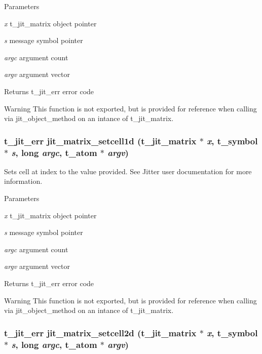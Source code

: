 \begin{DoxyParams}{Parameters}
\item[{\em x}]t\_\-jit\_\-matrix object pointer \item[{\em s}]message symbol pointer \item[{\em argc}]argument count \item[{\em argv}]argument vector\end{DoxyParams}
\begin{DoxyReturn}{Returns}
t\_\-jit\_\-err error code
\end{DoxyReturn}
\begin{DoxyWarning}{Warning}
This function is not exported, but is provided for reference when calling via jit\_\-object\_\-method on an intance of t\_\-jit\_\-matrix. 
\end{DoxyWarning}
\hypertarget{group__matrixmod_gacebbcc6a1a5a2211930b83e5742122e4}{
\subsubsection[{jit\_\-matrix\_\-setcell1d}]{\setlength{\rightskip}{0pt plus 5cm}t\_\-jit\_\-err jit\_\-matrix\_\-setcell1d (t\_\-jit\_\-matrix $\ast$ {\em x}, \/  {\bf t\_\-symbol} $\ast$ {\em s}, \/  long {\em argc}, \/  {\bf t\_\-atom} $\ast$ {\em argv})}}
\label{group__matrixmod_gacebbcc6a1a5a2211930b83e5742122e4}


Sets cell at index to the value provided. See Jitter user documentation for more information.


\begin{DoxyParams}{Parameters}
\item[{\em x}]t\_\-jit\_\-matrix object pointer \item[{\em s}]message symbol pointer \item[{\em argc}]argument count \item[{\em argv}]argument vector\end{DoxyParams}
\begin{DoxyReturn}{Returns}
t\_\-jit\_\-err error code
\end{DoxyReturn}
\begin{DoxyWarning}{Warning}
This function is not exported, but is provided for reference when calling via jit\_\-object\_\-method on an intance of t\_\-jit\_\-matrix. 
\end{DoxyWarning}
\hypertarget{group__matrixmod_ga364b87f2a873467d381aac89ba90e111}{
\subsubsection[{jit\_\-matrix\_\-setcell2d}]{\setlength{\rightskip}{0pt plus 5cm}t\_\-jit\_\-err jit\_\-matrix\_\-setcell2d (t\_\-jit\_\-matrix $\ast$ {\em x}, \/  {\bf t\_\-symbol} $\ast$ {\em s}, \/  long {\em argc}, \/  {\bf t\_\-atom} $\ast$ {\em argv})}}
\label{group__matrixmod_ga364b87f2a873467d381aac89ba90e111}


